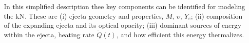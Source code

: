 

In this simplified description thee key components can be identified for modeling the \ac{kN}.
These are 
    (i) ejecta geometry and properties, $M$, $\upsilon$, $Y_e$; 
    (ii) composition of the expanding ejecta and its optical opacity; 
    (iii) dominant sources of energy within the ejecta, heating rate $\dot{Q}(t)$, and how 
    efficient this energy thermalizes.
%

